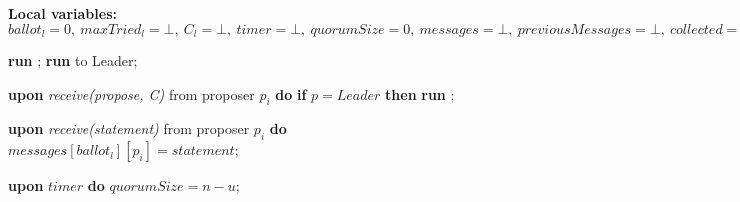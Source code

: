 \begin{algorithm}
\caption{Generalized Paxos - Proposer p}
\textbf{Local variables:} $ballot_l = 0,\ maxTried_l = \bot,\ C_l = \bot,\ timer = \bot,\ quorumSize = 0,\ messages = \bot,\ previousMessages = \bot,\ collected = False,\ verification = False, \ currentPhase = \bot$
\begin{algorithmic}[1]

        \State \textbf{run} ;
    \Else
        \State \textbf{run}  to Leader;
    \EndIf
    \EndFunction
        
    \State
    \State \textbf{upon} \textit{receive(propose, C)} from proposer $p_i$ \textbf{do} 
        \State \hspace{\algorithmicindent} \textbf{if} $p = Leader$ \textbf{then}
            \State \hspace{\algorithmicindent}\hspace{\algorithmicindent} \textbf{run} ;
    
    \State
    \State \textbf{upon} \textit{receive(statement)} from proposer $p_i$ \textbf{do}
    \State \hspace{\algorithmicindent} $messages[ballot_l][p_i] = statement$;
    
    \State
    \State \textbf{upon} $timer$ \textbf{do} 
    \State \hspace{\algorithmicindent} $quorumSize = n-u$;


\end{algorithmic}
\end{algorithm}
